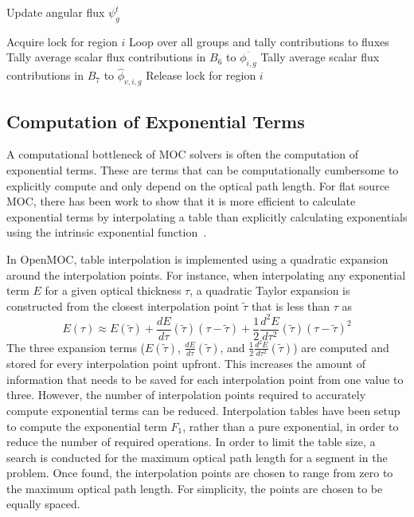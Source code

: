 \begin{algorithm*}[!h]
\begin{algorithmic}
		\State Update angular flux $\psi_g^{t}$ 

		\EndFor
		\vspace{0.1in}
		
		\State Acquire lock for region $i$
		 \Comment Loop over all groups and tally contributions to fluxes
		\vspace{0.1in}
		\State Tally average scalar flux contributions in $B_6$ to $\overline{\phi_{i,g}}$ 
		\State Tally average scalar flux contributions in $B_7$ to $\hat{\phi}_{v,i,g}$ 
		\vspace{0.1in}
		\EndFor
		\vspace{0.1in}
		\State Release lock for region $i$
		
	\end{algorithmic}
\end{algorithm*}

\clearpage
\subsection{Computation of Exponential Terms}
\label{sec:ls-exponential}

A computational bottleneck of \ac{MOC} solvers is often the computation of exponential terms. These are terms that can be computationally cumbersome to explicitly compute and only depend on the optical path length. For flat source \ac{MOC}, there has been work to show that it is more efficient to calculate exponential terms by interpolating a table than explicitly calculating exponentials using the intrinsic exponential function~\cite{boyd2014openmoc}. 

In OpenMOC, table interpolation is implemented using a quadratic expansion around the interpolation points. For instance, when interpolating any exponential term $E$ for a given optical thickness $\tau$, a quadratic Taylor expansion is constructed from the closest interpolation point $\tilde{\tau}$ that is less than $\tau$ as
\begin{equation}
E(\tau) \approx E\left(\tilde{\tau}\right) + \frac{dE}{d\tau}\left(\tilde{\tau}\right) \left(\tau - \tilde{\tau}\right) +  \frac{1}{2}\frac{d^2E}{d\tau^2}\left(\tilde{\tau}\right) \left(\tau - \tilde{\tau}\right)^2
\end{equation}
The three expansion terms ($E\left(\tilde{\tau}\right)$, $\frac{dE}{d\tau}\left(\tilde{\tau}\right)$, and $\frac{1}{2}\frac{d^2E}{d\tau^2}\left(\tilde{\tau}\right)$) are computed and stored for every interpolation point upfront. This increases the amount of information that needs to be saved for each interpolation point from one value to three. However, the number of interpolation points required to accurately compute exponential terms can be reduced. Interpolation tables have been setup to compute the exponential term $F_1$, rather than a pure exponential, in order to reduce the number of required operations. In order to limit the table size, a search is conducted for the maximum optical path length for a segment in the problem. Once found, the interpolation points are chosen to range from zero to the maximum optical path length. For simplicity, the points are chosen to be equally spaced.

